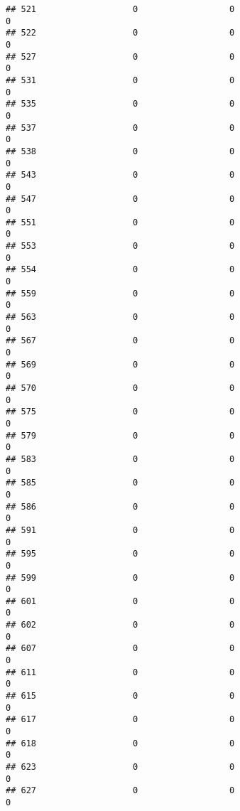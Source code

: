 \documentclass[
]{article}
\begin{document}
\begin{verbatim}
## 521                   0                  0                              0
## 522                   0                  0                              0
## 527                   0                  0                              0
## 531                   0                  0                              0
## 535                   0                  0                              0
## 537                   0                  0                              0
## 538                   0                  0                              0
## 543                   0                  0                              0
## 547                   0                  0                              0
## 551                   0                  0                              0
## 553                   0                  0                              0
## 554                   0                  0                              0
## 559                   0                  0                              0
## 563                   0                  0                              0
## 567                   0                  0                              0
## 569                   0                  0                              0
## 570                   0                  0                              0
## 575                   0                  0                              0
## 579                   0                  0                              0
## 583                   0                  0                              0
## 585                   0                  0                              0
## 586                   0                  0                              0
## 591                   0                  0                              0
## 595                   0                  0                              0
## 599                   0                  0                              0
## 601                   0                  0                              0
## 602                   0                  0                              0
## 607                   0                  0                              0
## 611                   0                  0                              0
## 615                   0                  0                              0
## 617                   0                  0                              0
## 618                   0                  0                              0
## 623                   0                  0                              0
## 627                   0                  0                              0

\end{verbatim}
\end{document}
